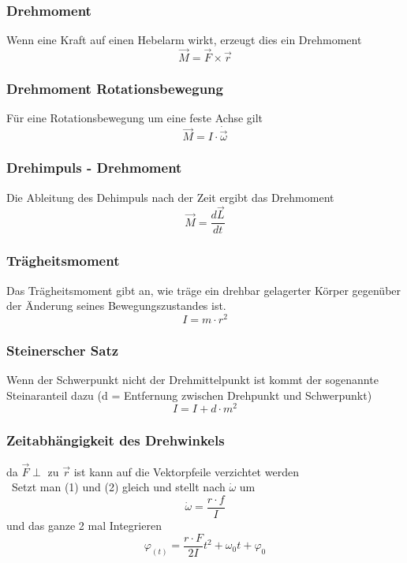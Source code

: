 \documentclass[%
   final,      %
   paper=a4, paper=portrait, pagesize=auto, %
   fontsize=11pt, %
   ngerman, %
 ]{scrartcl} %
\begin{document}
\subsubsection{Drehmoment}
Wenn eine Kraft auf einen Hebelarm wirkt, erzeugt dies ein Drehmoment
\begin{equation}
\vec{M}=\vec{F}\times\vec{r}
\end{equation}
\subsubsection{Drehmoment Rotationsbewegung}
Für eine Rotationsbewegung um eine feste Achse gilt
\begin{equation}
\vec{M}=I\cdot \dot{\vec{\omega}}
\end{equation}
\subsubsection{Drehimpuls - Drehmoment}
Die Ableitung des Dehimpuls nach der Zeit ergibt das Drehmoment
\begin{equation}
\vec{M}=\frac{d\vec{L}}{dt}
\end{equation}
\subsubsection{Trägheitsmoment}
Das Trägheitsmoment gibt an, wie träge ein drehbar gelagerter Körper gegenüber der Änderung seines Bewegungszustandes ist.
\begin{equation}
I = m\cdot r^{2}
\end{equation}
\subsubsection{Steinerscher Satz}
Wenn der Schwerpunkt nicht der Drehmittelpunkt ist kommt der sogenannte Steinaranteil dazu (d = Entfernung zwischen Drehpunkt und Schwerpunkt)
\begin{equation}
I=I+d\cdot m^{2}
\end{equation}
\subsubsection{Zeitabhängigkeit des Drehwinkels}
da $\vec{F} \perp$ zu $\vec{r}$ ist kann auf die Vektorpfeile verzichtet werden
\\\
Setzt man (1) und (2) gleich und stellt nach $\dot{\omega}$ um
\begin{equation}
\dot{\omega}=\frac{r\cdot f}{I}
\end{equation}
und das ganze 2 mal Integrieren
\begin{equation}
\varphi_{(t)} = \frac{r\cdot F}{2I}t^{2}+\omega_{0}t + \varphi_{0}
\end{equation}
\end{document}
